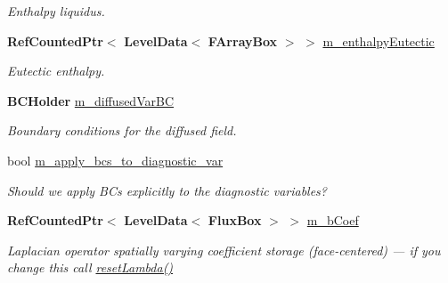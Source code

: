 \begin{DoxyCompactItemize}
\begin{DoxyCompactList}\small\item\em Enthalpy liquidus. \end{DoxyCompactList}\item 
\mbox{\label{class_a_m_r_non_linear_multi_comp_op_a84014ea27489edc10ca99fd27e3fa59b}} 
\textbf{ Ref\+Counted\+Ptr}$<$ \textbf{ Level\+Data}$<$ \textbf{ F\+Array\+Box} $>$ $>$ \hyperlink{class_a_m_r_non_linear_multi_comp_op_a84014ea27489edc10ca99fd27e3fa59b}{m\+\_\+enthalpy\+Eutectic}
\begin{DoxyCompactList}\small\item\em Eutectic enthalpy. \end{DoxyCompactList}\item 
\mbox{\label{class_a_m_r_non_linear_multi_comp_op_a84251f9cbb92946cd0eba54571ba0010}} 
\textbf{ B\+C\+Holder} \hyperlink{class_a_m_r_non_linear_multi_comp_op_a84251f9cbb92946cd0eba54571ba0010}{m\+\_\+diffused\+Var\+BC}
\begin{DoxyCompactList}\small\item\em Boundary conditions for the diffused field. \end{DoxyCompactList}\item 
\mbox{\label{class_a_m_r_non_linear_multi_comp_op_aba5ebae2d6ab73cc327456c221de7172}} 
bool \hyperlink{class_a_m_r_non_linear_multi_comp_op_aba5ebae2d6ab73cc327456c221de7172}{m\+\_\+apply\+\_\+bcs\+\_\+to\+\_\+diagnostic\+\_\+var}
\begin{DoxyCompactList}\small\item\em Should we apply B\+Cs explicitly to the diagnostic variables? \end{DoxyCompactList}\item 
\mbox{\label{class_a_m_r_non_linear_multi_comp_op_a585689df6d0c8fe37528664bad748725}} 
\textbf{ Ref\+Counted\+Ptr}$<$ \textbf{ Level\+Data}$<$ \textbf{ Flux\+Box} $>$ $>$ \hyperlink{class_a_m_r_non_linear_multi_comp_op_a585689df6d0c8fe37528664bad748725}{m\+\_\+b\+Coef}
\begin{DoxyCompactList}\small\item\em Laplacian operator spatially varying coefficient storage (face-\/centered) --- if you change this call \hyperlink{class_a_m_r_non_linear_multi_comp_op_aa558902d2bd88e41dff404c6b3ae206f}{reset\+Lambda()} \end{DoxyCompactList}\item 

\end{DoxyCompactItemize}
